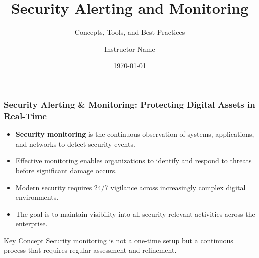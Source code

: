 \documentclass{beamer}
\title{Security Alerting and Monitoring}
\subtitle{Concepts, Tools, and Best Practices}
\author{Instructor Name}
\institute{University/Institution Name}
\date{\today}
\begin{document}
\begin{frame}
\titlepage
\end{frame}

\begin{frame}
\frametitle{Security Alerting \& Monitoring: Protecting Digital Assets in Real-Time}
\begin{itemize}
\item \textbf{Security monitoring} is the continuous observation of systems, applications, and networks to detect security events.
\item Effective monitoring enables organizations to identify and respond to threats before significant damage occurs.
\item Modern security requires 24/7 vigilance across increasingly complex digital environments.
\item The goal is to maintain visibility into all security-relevant activities across the enterprise.
\end{itemize}

\begin{alertblock}{Key Concept}
Security monitoring is not a one-time setup but a continuous process that requires regular assessment and refinement.
\end{alertblock}
\end{frame}
\end{document}
